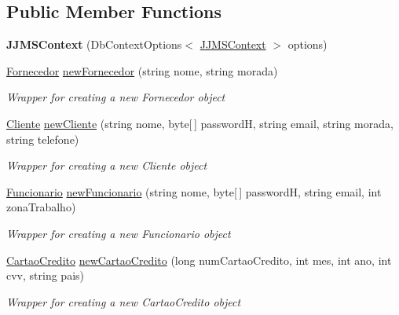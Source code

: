 \subsection*{Public Member Functions}
\begin{DoxyCompactItemize}
\item 
\mbox{\label{classmvc_j_j_m_s_1_1_data_1_1_j_j_m_s_context_ab338143e761b1a841c224145bbc0380c}} 
{\bfseries J\+J\+M\+S\+Context} (Db\+Context\+Options$<$ \mbox{\hyperlink{classmvc_j_j_m_s_1_1_data_1_1_j_j_m_s_context}{J\+J\+M\+S\+Context}} $>$ options)
\item 
\mbox{\hyperlink{classmvc_j_j_m_s_1_1_models_1_1_fornecedor}{Fornecedor}} \mbox{\hyperlink{classmvc_j_j_m_s_1_1_data_1_1_j_j_m_s_context_aa71841c7b21e94f09c58cbb72c5e7efa}{new\+Fornecedor}} (string nome, string morada)
\begin{DoxyCompactList}\small\item\em Wrapper for creating a new Fornecedor object \end{DoxyCompactList}\item 
\mbox{\hyperlink{classmvc_j_j_m_s_1_1_models_1_1_cliente}{Cliente}} \mbox{\hyperlink{classmvc_j_j_m_s_1_1_data_1_1_j_j_m_s_context_a1daadf80a1157014333476bc1dde9d86}{new\+Cliente}} (string nome, byte\mbox{[}$\,$\mbox{]} passwordH, string email, string morada, string telefone)
\begin{DoxyCompactList}\small\item\em Wrapper for creating a new Cliente object \end{DoxyCompactList}\item 
\mbox{\hyperlink{classmvc_j_j_m_s_1_1_models_1_1_funcionario}{Funcionario}} \mbox{\hyperlink{classmvc_j_j_m_s_1_1_data_1_1_j_j_m_s_context_a2024d653b72abde9d56963ee934605f6}{new\+Funcionario}} (string nome, byte\mbox{[}$\,$\mbox{]} passwordH, string email, int zona\+Trabalho)
\begin{DoxyCompactList}\small\item\em Wrapper for creating a new Funcionario object \end{DoxyCompactList}\item 
\mbox{\hyperlink{classmvc_j_j_m_s_1_1_models_1_1_cartao_credito}{Cartao\+Credito}} \mbox{\hyperlink{classmvc_j_j_m_s_1_1_data_1_1_j_j_m_s_context_ae62a0d5dd75b07b98cc1d6f8e608b256}{new\+Cartao\+Credito}} (long num\+Cartao\+Credito, int mes, int ano, int cvv, string pais)
\begin{DoxyCompactList}\small\item\em Wrapper for creating a new Cartao\+Credito object \end{DoxyCompactList}\item 

\end{DoxyCompactItemize}
